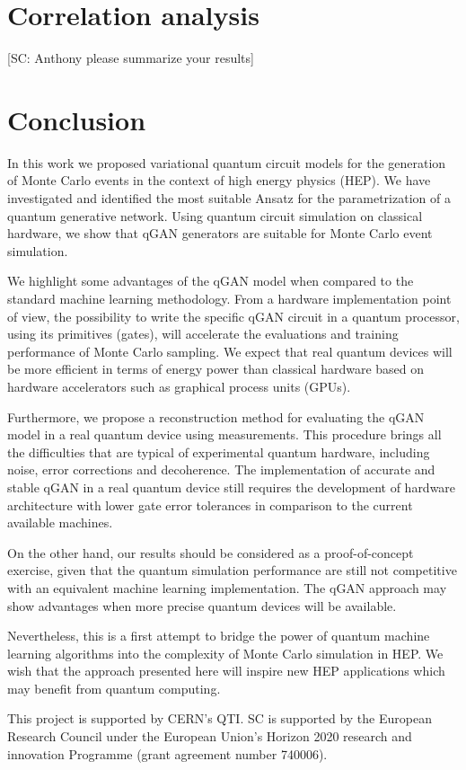 \documentclass[twocolumn,preprintnumbers,superscriptaddress]{revtex4-2}
\begin{document}
\section{Correlation analysis}

 {\color{red}[SC: Anthony please summarize your results]}

\section{Conclusion}
\label{sec:conclusion}

In this work we proposed variational quantum circuit models for the generation
of Monte Carlo events in the context of high energy physics (HEP). We have
investigated and identified the most suitable Ansatz for the parametrization of
a quantum generative network. Using quantum circuit simulation on classical
hardware, we show that qGAN generators are suitable for Monte Carlo event
simulation.

We highlight some advantages of the qGAN model when compared to the standard
machine learning methodology. From a hardware implementation point of view, the
possibility to write the specific qGAN circuit in a quantum processor, using
its primitives (gates), will accelerate the evaluations and training performance
of Monte Carlo sampling. We expect that real quantum devices will be more
efficient in terms of energy power than classical hardware based on hardware
accelerators such as graphical process units (GPUs).

Furthermore, we propose a reconstruction method for evaluating the qGAN
model in a real quantum device using measurements. This procedure brings all the
difficulties that are typical of experimental quantum hardware, including noise,
error corrections and decoherence. The implementation of accurate and stable
qGAN in a real quantum device still requires the development of hardware
architecture with lower gate error tolerances in comparison to the current
available machines.

On the other hand, our results should be considered as a proof-of-concept
exercise, given that the quantum simulation performance are still not
competitive with an equivalent machine learning implementation. The qGAN
approach may show advantages when more precise quantum devices will be
available.

Nevertheless, this is a first attempt to bridge the power of quantum machine
learning algorithms into the complexity of Monte Carlo simulation in HEP. We
wish that the approach presented here will inspire new HEP applications which
may benefit from quantum computing.

\acknowledgments

This project is supported by CERN's QTI. SC is supported by the European
Research Council under the European Union's Horizon 2020 research and innovation
Programme (grant agreement number 740006).


\end{document}

